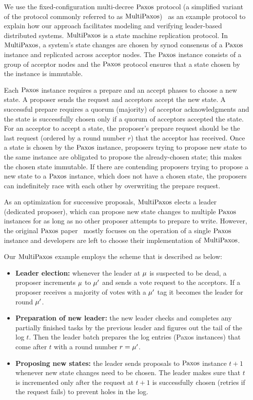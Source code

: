 We use the fixed-configuration multi-decree $\mathrm{Paxos}$ protocol (a simplified variant
of the protocol commonly referred to as $\mathrm{MultiPaxos}$)~\cite{rvrpaxos}
as an example protocol to explain how our approach facilitates modeling and
verifying leader-based distributed systems. $\mathrm{MultiPaxos}$ is a
state machine replication protocol. In $\mathrm{MultiPaxos}$, a system's state changes
are chosen by synod consensus of a $\mathrm{Paxos}$ instance and replicated across acceptor nodes.
The $\mathrm{Paxos}$ instance consists of a group of acceptor nodes and the $\mathrm{Paxos}$ protocol
ensures that a state chosen by the instance is immutable.

Each $\mathrm{Paxos}$ instance requires a prepare and an accept phases to choose a new
state. A proposer sends the request and acceptors accept the new state.
A successful prepare requires a quorum (majority) of acceptor acknowledgments
and the state is successfully chosen only if a quorum of acceptors
accepted the state. For an acceptor to accept a state, the proposer's prepare
request should be the last request (ordered by a round number $r$)
that the acceptor has received. Once a state is chosen by the $\mathrm{Paxos}$ instance,
proposers trying to propose new state to the same instance are obligated to
propose the already-chosen state; this makes the chosen state immutable.
If there are contending proposers trying to propose a new
state to a $\mathrm{Paxos}$ instance, which does not have a chosen state, the proposers
can indefinitely race with each other by overwriting the prepare request.

As an optimization for successive proposals, $\mathrm{MultiPaxos}$ elects a
leader (dedicated proposer), which can propose new state changes to multiple $\mathrm{Paxos}$
instances for as long as no other proposer attempts to prepare to write. However, the
original $\mathrm{Paxos}$ paper~\cite{paxos, paxosmadesimple} mostly focuses on the operation
of a single $\mathrm{Paxos}$ instance
and developers are left to choose their implementation of $\mathrm{MultiPaxos}$.


Our $\mathrm{MultiPaxos}$ example employs the scheme that is described as below:
\begin{itemize}
	\item {\textbf{Leader election: }} whenever the leader at $\mu$ is
		suspected to be dead, a proposer increments $\mu$ to $\mu'$ and
		sends a vote request to the acceptors.
		If a proposer receives a majority of votes with a $\mu'$ tag it
		becomes the leader for round $\mu'$.
	\item {\textbf{Preparation of new leader: }} the new leader checks and completes any
		partially finished tasks by the previous leader and figures out the
		tail of the log $t$. Then the leader batch prepares the log entries
		(Paxos instances) that come after $t$ with a round number $r = \mu'$.
	\item {\textbf{Proposing new states: }} the leader sends proposals
		to $\mathrm{Paxos}$ instance $t+1$ whenever new state changes need to be chosen.
		The leader makes sure that $t$ is incremented only after the
		request at $t+1$ is successfully chosen (retries if the
		request fails) to prevent holes in the log.
\end{itemize}


